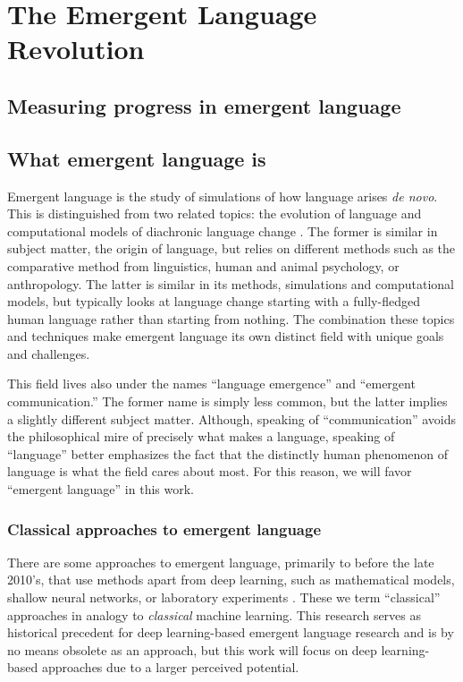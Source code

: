 \chapter{The Emergent Language Revolution}
\section{Measuring progress in emergent language}
\section{What emergent language is}
Emergent language  is the study of simulations of how language arises \emph{de novo}.
This is distinguished from two related topics: the evolution of language and computational models of diachronic language change .
The former is similar in subject matter, the origin of language, but relies on different methods such as the comparative method from linguistics, human and animal psychology, or anthropology.
The latter is similar in its methods, simulations and computational models, but typically looks at language change starting with a fully-fledged human language rather than starting from nothing.
The combination these topics and techniques make emergent language its own distinct field with unique goals and challenges.

This field lives also under the names ``language emergence'' and ``emergent communication.''
The former name is simply less common, but the latter implies a slightly different subject matter.
Although, speaking of ``communication'' avoids the philosophical mire of  precisely what makes a language, speaking of ``language'' better emphasizes the fact that the distinctly human phenomenon of language is what the field cares about most.
For this reason, we will favor ``emergent language'' in this work.

\subsection{Classical approaches to emergent language}
There are some approaches to emergent language, primarily  to before the late 2010's, that use methods apart from deep learning, such as mathematical models, shallow neural networks, or laboratory experiments  .
These we term ``classical'' approaches in analogy to \emph{classical} machine learning.
This research serves as historical precedent for deep learning-based emergent language research and is by no means obsolete as an approach, but this work will focus on deep learning-based approaches due to a larger perceived potential.

